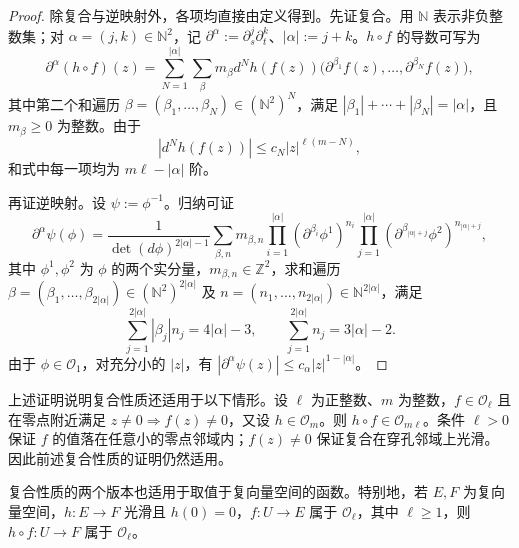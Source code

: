 \begin{proof}
除复合与逆映射外，各项均直接由定义得到。先证复合。用 $\mathbb N$ 表示非负整数集；对 $\alpha=(j,k)\in\mathbb N^2$，记 $\partial^\alpha:=\partial_s^j\partial_t^k$、$|\alpha|:=j+k$。$h\circ f$ 的导数可写为
\[
  \partial^\alpha(h\circ f)(z)
  =\sum_{N=1}^{|\alpha|}\sum_\beta m_\beta
    d^Nh(f(z))\bigl(\partial^{\beta_1}f(z),\ldots,
                       \partial^{\beta_N}f(z)\bigr),
\]
其中第二个和遍历 $\beta=(\beta_1,\ldots,\beta_N)\in(\mathbb N^2)^N$，满足 $|\beta_1|+\cdots+|\beta_N|=|\alpha|$，且 $m_\beta\ge0$ 为整数。由于
\[
  |d^Nh(f(z))|\le c_N|z|^{\ell(m-N)},
\]
和式中每一项均为 $m\ell-|\alpha|$ 阶。

再证逆映射。设 $\psi:=\phi^{-1}$。归纳可证
\[
  \partial^\alpha\psi(\phi)
  =\frac{1}{\det(d\phi)^{2|\alpha|-1}}
    \sum_{\beta,n}m_{\beta,n}
    \prod_{i=1}^{|\alpha|}(\partial^{\beta_i}\phi^1)^{n_i}
    \prod_{j=1}^{|\alpha|}
       (\partial^{\beta_{|\alpha|+j}}\phi^2)^{n_{|\alpha|+j}},
\]
其中 $\phi^1,\phi^2$ 为 $\phi$ 的两个实分量，$m_{\beta,n}\in\mathbb Z^2$，求和遍历 $\beta=(\beta_1,\ldots,\beta_{2|\alpha|})\in(\mathbb N^2)^{2|\alpha|}$ 及 $n=(n_1,\ldots,n_{2|\alpha|})\in\mathbb N^{2|\alpha|}$，满足
\[
  \sum_{j=1}^{2|\alpha|}|\beta_j|n_j=4|\alpha|-3,
  \qquad \sum_{j=1}^{2|\alpha|}n_j=3|\alpha|-2.
\]
由于 $\phi\in\mathcal O_1$，对充分小的 $|z|$，有 $|\partial^\alpha\psi(z)|\le c_\alpha|z|^{1-|\alpha|}$。
\end{proof}

\begin{remark}\label{rem:E-5-4}
上述证明说明复合性质还适用于以下情形。设 $\ell$ 为正整数、$m$ 为整数，$f\in\mathcal O_\ell$ 且在零点附近满足 $z\ne0\Rightarrow f(z)\ne0$，又设 $h\in\mathcal O_m$。则 $h\circ f\in\mathcal O_{m\ell}$。条件 $\ell>0$ 保证 $f$ 的值落在任意小的零点邻域内；$f(z)\ne0$ 保证复合在穿孔邻域上光滑。因此前述复合性质的证明仍然适用。
\end{remark}

\begin{remark}\label{rem:E-5-5}
复合性质的两个版本也适用于取值于复向量空间的函数。特别地，若 $E,F$ 为复向量空间，$h:E\to F$ 光滑且 $h(0)=0$，$f:U\to E$ 属于 $\mathcal O_\ell$，其中 $\ell\ge1$，则 $h\circ f:U\to F$ 属于 $\mathcal O_\ell$。
\end{remark}

